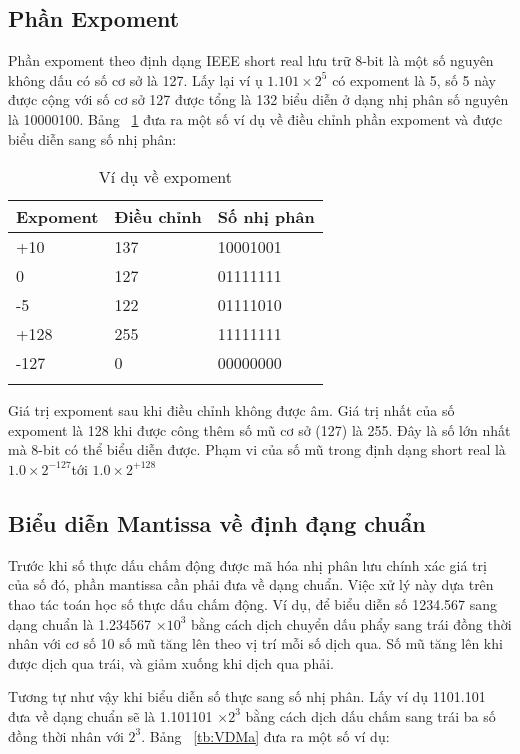  	 \subsection*{Phần Expoment}
 Phần expoment theo định dạng IEEE short real lưu trữ 8-bit là một số nguyên không dấu có số cơ sở là 127. Lấy lại ví ụ $1.101 \times 2^5$ có expoment là 5, số 5 này được cộng với số cơ sở 127 được tổng là 132 biểu diễn ở dạng nhị phân số nguyên là 10000100. Bảng ~\ref{tb:VDEx} đưa ra một số ví dụ về điều chỉnh phần expoment và được biểu diễn sang số nhị phân:
 	\begin{longtable}{|l|l|l|}
 		\hline
 			Expoment & Điều chỉnh & Số nhị phân \\
 		\hline
 		\hline
 			+10 & 137 & 10001001 \\
 		\hline
 			0 & 127 & 01111111 \\
 		\hline
 			-5 & 122 & 01111010 \\
 		\hline
 			+128 & 255 & 11111111 \\
 		\hline
 			-127 & 0 & 00000000 \\ 		
 		\hline
 			\caption{Ví dụ về expoment}
 			\label{tb:VDEx}
 	\end{longtable}
 	
 	Giá trị expoment sau khi điều chỉnh không được âm. Giá trị nhất của số expoment là 128 khi được công thêm số mũ cơ sở (127) là 255. Đây là số lớn nhất mà 8-bit có thể biểu diễn được. Phạm vi của số mũ trong định dạng short real là $1.0 \times 2^{-127} $tới $1.0 \times 2^{+128}$
\subsection*{Biểu diễn Mantissa về định đạng chuẩn}
	Trước khi số thực dấu chấm động được mã hóa nhị phân lưu chính xác giá trị của số đó, phần mantissa cần phải đưa về dạng chuẩn. Việc xử lý này dựa trên thao tác toán học số thực dấu chấm động. Ví dụ, để biểu diễn số 1234.567 sang dạng chuẩn là 1.234567 $\times 10^3$ bằng cách dịch chuyển dấu phẩy sang trái đồng thời nhân với cơ số 10 số mũ tăng lên theo vị trí mỗi số dịch qua. Số mũ tăng lên khi được dịch qua trái, và giảm xuống khi dịch qua phải.
	
	Tương tự như vậy khi biểu diễn số thực sang số nhị phân. Lấy ví dụ 1101.101 đưa về dạng chuẩn sẽ là 1.101101 $\times 2^3$ bằng cách dịch dấu chấm sang trái ba số đồng thời nhân với  $2^3$. Bảng ~\ref{tb:VDMa} đưa ra một số ví dụ: \\ \\
	
